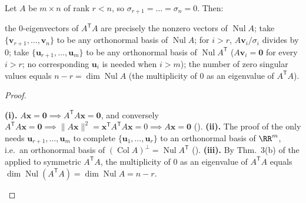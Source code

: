 \documentclass[10pt]{scrartcl}
\newcommand{\vv}[1]{\mathbf{#1}}
\DeclareMathOperator{\Nul}{Nul}
\DeclareMathOperator{\Col}{Col}
\begin{document}
\begin{proposition*}
  Let $A$ be $m\times n$ of rank $r<n$, so $\sigma_{r+1}=\dots=\sigma_n=0$. Then:
  \begin{enumerate}
    \ii[(i)] the $0$-eigenvectors of $A^{\mathsf T}A$ are precisely the nonzero vectors of $\Nul A$; take $\{\vv v_{r+1},\dots,\vv v_n\}$ to be any orthonormal basis of $\Nul A$;
    \ii[(ii)] for $i>r$, $A\vv v_i/\sigma_i$ divides by $0$; take $\{\vv u_{r+1},\dots,\vv u_m\}$ to be any orthonormal basis of $\Nul A^{\mathsf T}$ ($A\vv v_i=\vv 0$ for every $i>r$; no corresponding $\vv u_i$ is needed when $i>m$);
    \ii[(iii)] the number of zero singular values equals $n-r=\dim\Nul A$ (the multiplicity of $0$ as an eigenvalue of $A^{\mathsf T}A$).
  \end{enumerate}
\end{proposition*}
\begin{proof}
  \begin{steps}
    \ii \textbf{(i).} $A\vv x=\vv 0\implies A^{\mathsf T}A\vv x=\vv 0$, and conversely $A^{\mathsf T}A\vv x=\vv 0\implies \|A\vv x\|^2=\vv x^{\mathsf T}A^{\mathsf T}A\vv x=0\implies A\vv x=\vv 0$ ().
    \ii \textbf{(ii).} The proof of the  only needs $\vv u_{r+1},\dots,\vv u_m$ to complete $\{\vv u_1,\dots,\vv u_r\}$ to an orthonormal basis of $\RR^m$, i.e.\ an orthonormal basis of $(\Col A)^\perp=\Nul A^{\mathsf T}$ ().
    \ii \textbf{(iii).} By Thm.~3(b) of the  applied to symmetric $A^{\mathsf T}A$, the multiplicity of $0$ as an eigenvalue of $A^{\mathsf T}A$ equals $\dim\Nul(A^{\mathsf T}A)=\dim\Nul A=n-r$. \qedhere
  \end{steps}
\end{proof}
\end{document}

